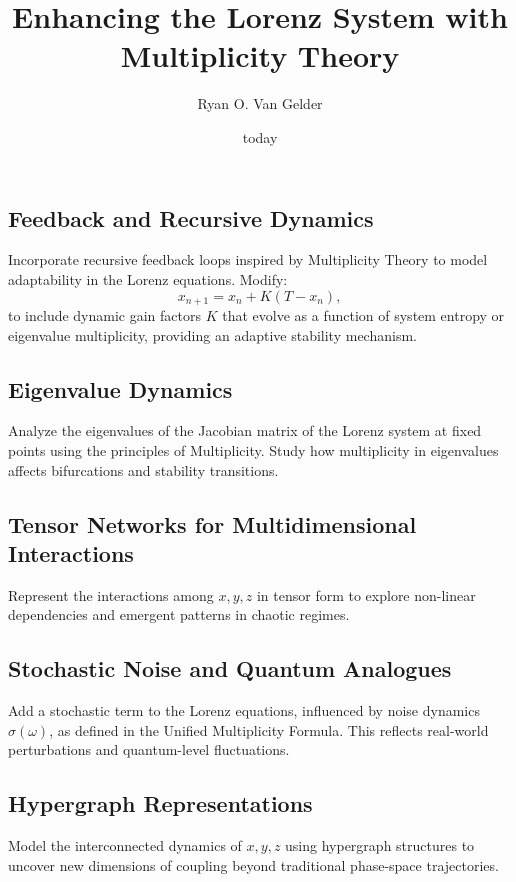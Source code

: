 \documentclass{article}
\theoremstyle{plain}
\begin{document}
\title{Enhancing the Lorenz System with Multiplicity Theory}
\author{Ryan O. Van Gelder}
\date{today}

\maketitle
\subsection*{Feedback and Recursive Dynamics}
Incorporate recursive feedback loops inspired by Multiplicity Theory to model adaptability in the Lorenz equations. Modify:
\[
x_{n+1} = x_n + K(T - x_n),
\]
to include dynamic gain factors \(K\) that evolve as a function of system entropy or eigenvalue multiplicity, providing an adaptive stability mechanism.

\subsection*{Eigenvalue Dynamics}
Analyze the eigenvalues of the Jacobian matrix of the Lorenz system at fixed points using the principles of Multiplicity. Study how multiplicity in eigenvalues affects bifurcations and stability transitions.

\subsection*{Tensor Networks for Multidimensional Interactions}
Represent the interactions among \(x, y, z\) in tensor form to explore non-linear dependencies and emergent patterns in chaotic regimes.

\subsection*{Stochastic Noise and Quantum Analogues}
Add a stochastic term to the Lorenz equations, influenced by noise dynamics \(\sigma(\omega)\), as defined in the Unified Multiplicity Formula. This reflects real-world perturbations and quantum-level fluctuations.

\subsection*{Hypergraph Representations}
Model the interconnected dynamics of \(x, y, z\) using hypergraph structures to uncover new dimensions of coupling beyond traditional phase-space trajectories.
\end{document}
